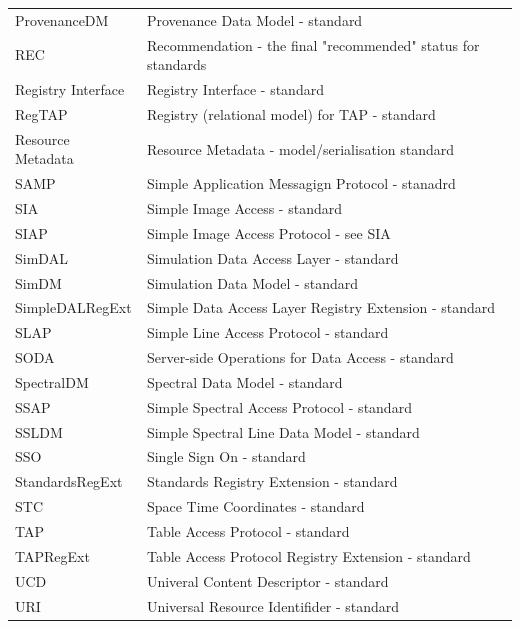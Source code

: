 \documentclass[11pt,letter]{ivoa}
\begin{document}
{\begin{longtable}[t]{l l}
        {ProvenanceDM} &
        {Provenance Data Model - standard} \\
        {REC} &
        {Recommendation - the final "recommended" status for standards} \\
        {Registry Interface} &
        {Registry Interface - standard} \\
        {RegTAP} &
        {Registry (relational model) for TAP - standard} \\
        {Resource Metadata} &
        {Resource Metadata - model/serialisation standard} \\
        {SAMP} &
        {Simple Application Messagign Protocol - stanadrd} \\
        {SIA} &
        {Simple Image Access - standard} \\
        {SIAP} &
        {Simple Image Access Protocol - see SIA}  \\
        {SimDAL} &
        {Simulation Data Access Layer - standard} \\
        {SimDM} &
        {Simulation Data Model - standard} \\
        {SimpleDALRegExt} &
        {Simple Data Access Layer Registry Extension - standard} \\
        {SLAP} &
        {Simple Line Access Protocol - standard} \\
        {SODA}  &
        {Server-side Operations for Data Access - standard} \\
        {SpectralDM} &
        {Spectral Data Model - standard} \\
        {SSAP} &
        {Simple Spectral Access Protocol - standard} \\
        {SSLDM} &
        {Simple Spectral Line Data Model - standard} \\
        {SSO} &
        {Single Sign On - standard} \\
        {StandardsRegExt} &
        {Standards Registry Extension - standard} \\
        {STC} &
        {Space Time Coordinates - standard} \\
        {TAP} &
        {Table Access Protocol - standard} \\
        {TAPRegExt} &
        {Table Access Protocol Registry Extension - standard} \\
        {UCD} &
        {Univeral Content Descriptor - standard} \\
        {URI}  &
        {Universal Resource Identifider - standard} \\

\end{longtable}}
\end{document}
